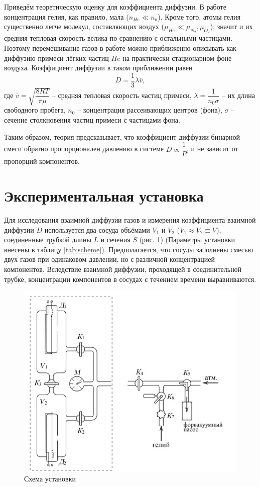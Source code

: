 \documentclass[12pt,a4paper]{article}
\begin{document}
	Приведём теоретическую оценку для коэффициента диффузии.
	В работе концентрация гелия, как правило, мала ($n_{He} \ll n_{\text{в}}$).
	Кроме того, атомы гелия существенно легче молекул, составляющих воздух ($\mu_{He} \ll \mu_{N_2}, \mu_{O_2}$), значит и их средняя тепловая скорость велика по сравнению с остальными частицами.
	Поэтому перемешивание газов в работе можно приближенно описывать как диффузию примеси лёгких частиц $He$ на практически стационарном фоне воздуха.
	Коэффициент диффузии в таком приближении равен 
	\begin{equation}\label{eq:lambda}
		D = \dfrac{1}{3} \lambda \overline{v},
	\end{equation}
	где $\overline{v} = \sqrt{\dfrac{8RT}{\pi \mu}}$ -- средняя тепловая скорость частиц примеси, $\lambda = \dfrac{1}{n_0 \sigma}$ -- их длина свободного пробега, $n_0$ -- концентрация рассеивающих центров (фона), $\sigma$ -- сечение столкновения частиц примеси с частицами фона.

	Таким образом, теория предсказывает, что коэффициент диффузии бинарной смеси обратно пропорционален давлению в системе $D \propto \dfrac{1}{P}$, и не зависит от пропорций компонентов.

\section*{Экспериментальная установка}
	Для исследования взаимной диффузии газов и измерения коэффициента взаимной диффузии $D$ используется два сосуда объёмами $V_1$ и $V_2$ ($V_1 \approx V_2 \equiv V$), соединенные трубкой длины $L$ и сечения $S$ (рис. 1) (Параметры установки внесены в таблицу \ref{tab:scheme}).
	Предполагается, что сосуды заполнены смесью двух газов при одинаковом давлении, но с различной концентрацией компонентов.
	Вследствие взаимной диффузии, проходящей в соединительной трубке, концентрации компонентов в сосудах с течением времени выравниваются.

	\begin{figure}[h]
		\centering
		\includegraphics[width=0.8\linewidth]{res/scheme}
		\caption{Схема установки}
		\label{fig:scheme}
	\end{figure}
	
\end{document}
